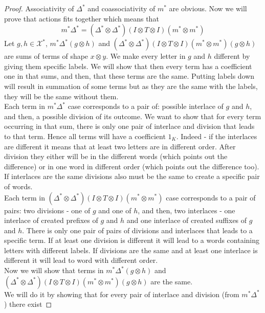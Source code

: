 \documentclass[a4paper, 12pt]{article}
\begin{document}
\begin{proof}
Associativity of $\Delta^*$ and coassociativity of $m^*$ are obvious.
Now we will prove that actions fits together which means that
\begin{equation*}
m^*\Delta^* = (\Delta^*\otimes \Delta^*)(I \otimes T \otimes I)(m^* \otimes m^*)
\end{equation*}
Let $g, h \in \mathcal{X}^*$, $m^*\Delta^*(g \otimes h)$ and $(\Delta^*\otimes \Delta^*)(I \otimes T \otimes
I)(m^* \otimes m^*)(g \otimes h)$ are sums of terms of shape $x \otimes y$. We make every letter in
$g$ and $h$ different by giving them specific labels. We will show that then every term has
a coefficient one in that sums, and then, that these terms are the same. Putting labels down will result in
summation of some terms but as they are the same with the labels, they will be the same without them.\\
\indent Each term in $m^*\Delta^*$ case corresponds to a pair of: possible interlace of $g$ and $h$, and
then, a possible division of its outcome. We want to show that for every term occurring in that sum, there
is only one pair of interlace and division that leads to that term. Hence all terms will have a coefficient
$1_K$. Indeed - if the interlaces are different it means that at least two letters are in different order.
After division they either will be in the different words (which points out the difference) or in one word in
different order (which points out the difference too). If interlaces are the same divisions also must be
the same
to create a specific pair of words. \\
\indent Each term in $(\Delta^*\otimes \Delta^*)(I \otimes T \otimes I)(m^* \otimes m^*)$ case corresponds to
a pair of pairs: two divisions - one of $g$ and one of $h$, and then, two interlaces - one interlace of
created prefixes of $g$ and $h$ and one interlace of created suffixes of $g$ and $h$.
There is only one pair of pairs of divisions and interlaces that leads to a specific term. If at least one
division is different it will lead to a words containing letters with different labels. If divisions are
the same and at least one interlace is different it will lead to word with different order. \\
\indent Now we will show that terms in $m^*\Delta^*(g \otimes h)$ and $(\Delta^*\otimes \Delta^*)(I \otimes T
\otimes I)(m^* \otimes m^*)(g \otimes h)$ are the same. \\
We will do it by showing that for every pair of interlace and division (from $m^*\Delta^*$) there exist

\end{proof}
\end{document}

